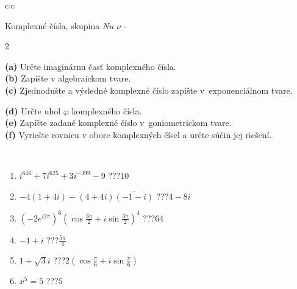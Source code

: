 \documentclass[10pt]{report}
\begin{document}
\begin{tabular}{c:c}
\begin{minipage}[c][104.5mm][t]{0.5\linewidth}
\begin{center}
\vspace{7mm}
{\huge Komplexné čísla, skupina \textit{Nu $\nu$} -}\\[5mm]
\begin{minipage}{0.95\linewidth}
\begin{center}
{\small \begin{multicols}{2} \raggedright
\textbf{(a)} Určte imaginárnu časť komplexného čísla. \\[1mm]
\textbf{(b)} Zapíšte v algebraickom tvare. \\[1mm]
\textbf{(c)} Zjednodušte a výsledné komplexné číslo zapíšte v~exponenciálnom tvare. \par \columnbreak
\textbf{(d)} Určte uhol \(\varphi\) komplexného čísla. \\[1mm]
\textbf{(e)} Zapíšte zadané komplexné číslo v~goniometrickom tvare. \\[1mm]
\textbf{(f)} Vyriešte rovnicu v obore komplexných čísel a určte súčin jej riešení.
\end{multicols}
}
\end{center}
\end{minipage}
\\[4mm]
\begin{minipage}{0.79\linewidth}
\begin{center}
\begin{varwidth}{\linewidth}
\begin{enumerate}
\large
\item $i^{646}+7i^{625}+3i^{-399}-9$\quad \dotfill\; ???\;\dotfill \quad $10$
\item $-4(1+4i)-(4+4i)\overline{(-1-i)}$\quad \dotfill\; ???\;\dotfill \quad $4-8i$
\item $\left(-2e^{i2\pi}\right)^{6}\left(\cos{\frac{3\pi}{2}}+i\sin{\frac{3\pi}{2}}\right)^{4}$\quad \dotfill\; ???\;\dotfill \quad $64$
\item $-1+i$\quad \dotfill\; ???\;\dotfill \quad $\frac{5\pi}{4}$
\item $1+\sqrt{3}i$\quad \dotfill\; ???\;\dotfill \quad $2\left(\cos{\frac{\pi}{6}}+i\sin{\frac{\pi}{6}}\right)$
\item $x^5=5$\quad \dotfill\; ???\;\dotfill \quad $5$
\end{enumerate}
\end{varwidth}
\end{center}

\end{minipage}
\end{center}
\end{minipage}
\end{tabular}
\end{document}
